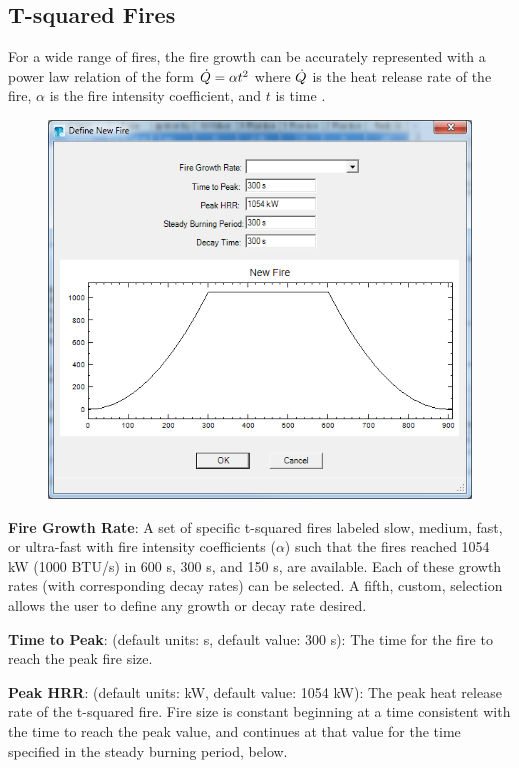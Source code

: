 \subsection{T-squared Fires}

For a wide range of fires, the fire growth can be accurately represented with a power law relation of the form $\dot{Q}=\alpha t^2$  where $\dot{Q}$  is the heat release rate of the fire, $\alpha$ is the fire intensity coefficient, and $t$ is time \cite{Schifiliti:2002}.

\begin{figure}[h!]
\begin{center}
\includegraphics[width=5in]{FIGURES/Input_File/Create_t2}
\end{center}
\end{figure}

\textbf{Fire Growth Rate}: A set of specific t-squared fires labeled slow, medium, fast, or ultra-fast with fire intensity coefficients ($\alpha$) such that the fires reached 1054 kW (1000 BTU/s) in 600 s, 300 s, and 150 s, are available.  Each of these growth rates (with corresponding decay rates) can be selected. A fifth, custom, selection allows the user to define any growth or decay rate desired.

\textbf{Time to Peak}: (default units: s, default value: 300 s): The time for the fire to reach the peak fire size.

\textbf{Peak HRR}: (default units: kW, default value: 1054 kW): The peak heat release rate of the t-squared fire.  Fire size is constant beginning at a time consistent with the time to reach the peak value,   and continues at that value for the time specified in the steady burning period, below.

